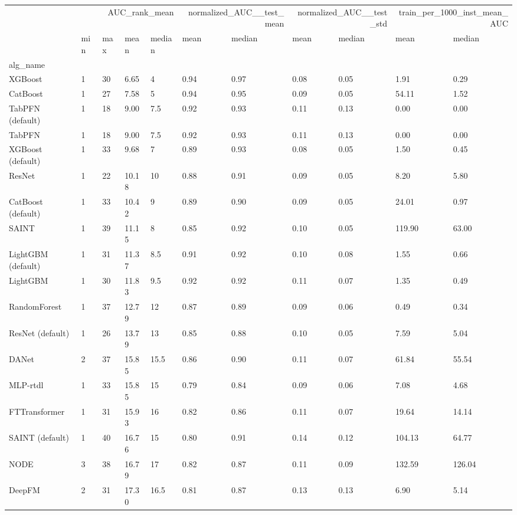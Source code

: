 \begin{tabular}{lllllllllll}
\toprule
 & \multicolumn{4}{r}{AUC_rank_mean} & \multicolumn{2}{r}{normalized_AUC__test_mean} & \multicolumn{2}{r}{normalized_AUC__test_std} & \multicolumn{2}{r}{train_per_1000_inst_mean_AUC} \\
 & min & max & mean & median & mean & median & mean & median & mean & median \\
alg_name &  &  &  &  &  &  &  &  &  &  \\
\midrule
XGBoost & 1 & 30 & 6.65 & 4 & 0.94 & 0.97 & 0.08 & 0.05 & 1.91 & 0.29 \\
CatBoost & 1 & 27 & 7.58 & 5 & 0.94 & 0.95 & 0.09 & 0.05 & 54.11 & 1.52 \\
TabPFN (default) & 1 & 18 & 9.00 & 7.5 & 0.92 & 0.93 & 0.11 & 0.13 & 0.00 & 0.00 \\
TabPFN & 1 & 18 & 9.00 & 7.5 & 0.92 & 0.93 & 0.11 & 0.13 & 0.00 & 0.00 \\
XGBoost (default) & 1 & 33 & 9.68 & 7 & 0.89 & 0.93 & 0.08 & 0.05 & 1.50 & 0.45 \\
ResNet & 1 & 22 & 10.18 & 10 & 0.88 & 0.91 & 0.09 & 0.05 & 8.20 & 5.80 \\
CatBoost (default) & 1 & 33 & 10.42 & 9 & 0.89 & 0.90 & 0.09 & 0.05 & 24.01 & 0.97 \\
SAINT & 1 & 39 & 11.15 & 8 & 0.85 & 0.92 & 0.10 & 0.05 & 119.90 & 63.00 \\
LightGBM (default) & 1 & 31 & 11.37 & 8.5 & 0.91 & 0.92 & 0.10 & 0.08 & 1.55 & 0.66 \\
LightGBM & 1 & 30 & 11.83 & 9.5 & 0.92 & 0.92 & 0.11 & 0.07 & 1.35 & 0.49 \\
RandomForest & 1 & 37 & 12.79 & 12 & 0.87 & 0.89 & 0.09 & 0.06 & 0.49 & 0.34 \\
ResNet (default) & 1 & 26 & 13.79 & 13 & 0.85 & 0.88 & 0.10 & 0.05 & 7.59 & 5.04 \\
DANet & 2 & 37 & 15.85 & 15.5 & 0.86 & 0.90 & 0.11 & 0.07 & 61.84 & 55.54 \\
MLP-rtdl & 1 & 33 & 15.85 & 15 & 0.79 & 0.84 & 0.09 & 0.06 & 7.08 & 4.68 \\
FTTransformer & 1 & 31 & 15.93 & 16 & 0.82 & 0.86 & 0.11 & 0.07 & 19.64 & 14.14 \\
SAINT (default) & 1 & 40 & 16.76 & 15 & 0.80 & 0.91 & 0.14 & 0.12 & 104.13 & 64.77 \\
NODE & 3 & 38 & 16.79 & 17 & 0.82 & 0.87 & 0.11 & 0.09 & 132.59 & 126.04 \\
DeepFM & 2 & 31 & 17.30 & 16.5 & 0.81 & 0.87 & 0.13 & 0.13 & 6.90 & 5.14 \\

\end{tabular}
